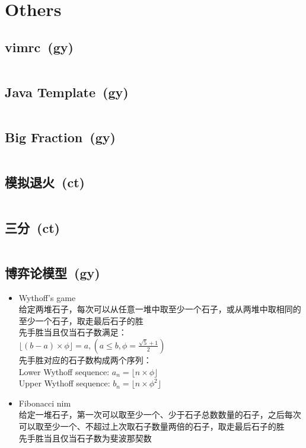 \chapter{Others}
\section{vimrc\ \small(gy)}
\inputminted{vim}{Others/.vimrc}
\section{Java Template\ \small(gy)}
\inputminted{java}{Others/Template.java}
\section{Big Fraction\ \small(gy)}
\inputminted{kotlin}{Others/big_fraction.kt}
\section{模拟退火\ \small(ct)}
\inputminted{cpp}{Others/simulated_annealing.cpp}
\section{三分\ \small(ct)}
\inputminted{cpp}{Others/cubic_search.cpp}
\section{博弈论模型\ \small(gy)}
\begin{itemize}
	\item Wythoff's game\\给定两堆石子，每次可以从任意一堆中取至少一个石子，或从两堆中取相同的至少一个石子，取走最后石子的胜\\先手胜当且仅当石子数满足：\\$\lfloor (b - a) \times \phi \rfloor=a, (a \leq b, \phi = \frac{\sqrt{5} + 1}{2})$\\先手胜对应的石子数构成两个序列：\\Lower Wythoff sequence: $a_n = \lfloor n \times \phi \rfloor$\\Upper Wythoff sequence: $b_n = \lfloor n \times \phi ^ 2 \rfloor$
	\item Fibonacci nim\\给定一堆石子，第一次可以取至少一个、少于石子总数数量的石子，之后每次可以取至少一个、不超过上次取石子数量两倍的石子，取走最后石子的胜\\先手胜当且仅当石子数为斐波那契数
\end{itemize}